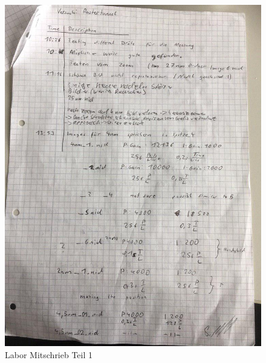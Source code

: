 \begin{figure}[ht]
	\includegraphics[scale=0.5]{Bild/L1}
	\centering
	\caption{Labor Mitschrieb Teil 1}
\end{figure}
